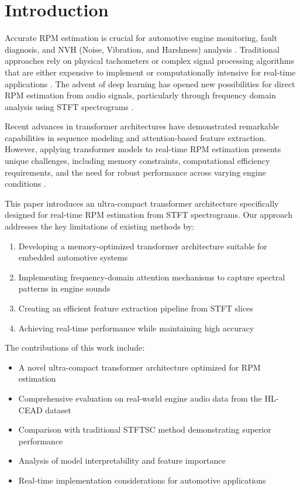 \documentclass[journal,10pt]{IEEEtran}
\begin{document}
\IEEEpeerreviewmaketitle

\section{Introduction}

Accurate RPM estimation is crucial for automotive engine monitoring, fault diagnosis, and NVH (Noise, Vibration, and Harshness) analysis \cite{measurement}. Traditional approaches rely on physical tachometers or complex signal processing algorithms that are either expensive to implement or computationally intensive for real-time applications \cite{nontac}. The advent of deep learning has opened new possibilities for direct RPM estimation from audio signals, particularly through frequency domain analysis using STFT spectrograms \cite{NN}.

Recent advances in transformer architectures \cite{transformer} have demonstrated remarkable capabilities in sequence modeling and attention-based feature extraction. However, applying transformer models to real-time RPM estimation presents unique challenges, including memory constraints, computational efficiency requirements, and the need for robust performance across varying engine conditions \cite{RNN1}.

This paper introduces an ultra-compact transformer architecture specifically designed for real-time RPM estimation from STFT spectrograms. Our approach addresses the key limitations of existing methods by:

\begin{enumerate}
    \item Developing a memory-optimized transformer architecture suitable for embedded automotive systems
    \item Implementing frequency-domain attention mechanisms to capture spectral patterns in engine sounds
    \item Creating an efficient feature extraction pipeline from STFT slices
    \item Achieving real-time performance while maintaining high accuracy
\end{enumerate}

The contributions of this work include:

\begin{itemize}
    \item A novel ultra-compact transformer architecture optimized for RPM estimation
    \item Comprehensive evaluation on real-world engine audio data from the HL-CEAD dataset
    \item Comparison with traditional STFTSC method demonstrating superior performance
    \item Analysis of model interpretability and feature importance
    \item Real-time implementation considerations for automotive applications
\end{itemize}
\end{document}
